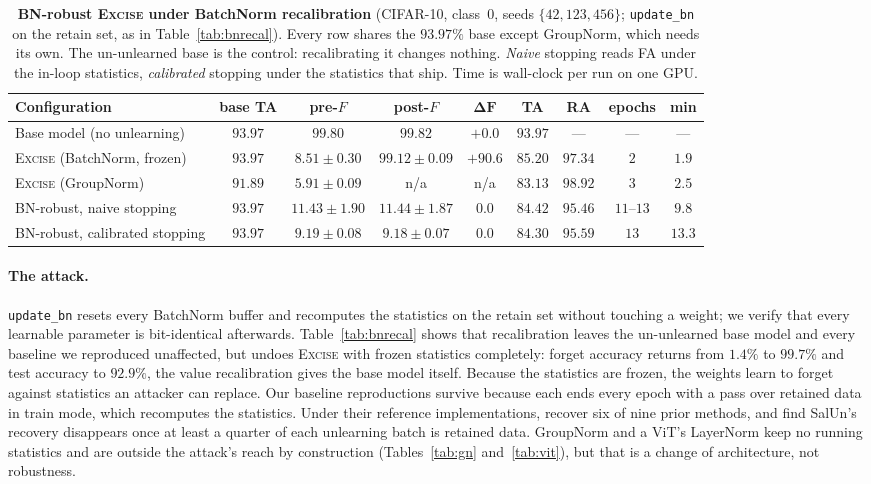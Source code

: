 \documentclass{article}
\newcommand{\ours}{\textsc{Excise}}
\newcommand{\added}[1]{{\color{revised}#1}}
\newcommand{\rev}[1]{{\color{revisedB}#1}}
\theoremstyle{remark}
\theoremstyle{plain}
\begin{document}
\begin{table}[t]
\centering\color{revised}
\caption{\added{\textbf{BN-robust \ours{} under BatchNorm recalibration} (CIFAR-10,
class~0, seeds $\{42,123,456\}$; \texttt{update\_bn} on the retain set, as in
Table~\ref{tab:bnrecal}). Every row shares the $93.97\%$ base except GroupNorm,
which needs its own. The un-unlearned base is the control: recalibrating it
changes nothing. \emph{Naive} stopping reads FA under the in-loop statistics,
\emph{calibrated} stopping under the statistics that ship. Time is wall-clock per
run on one GPU.}}
\label{tab:bnrobust}
\small
\setlength{\tabcolsep}{4pt}
\begin{tabular}{@{}lcccccccc@{}}
\toprule
Configuration & base TA & pre-$F$ & post-$F$ & $\boldsymbol{\Delta F}$ & TA & RA & epochs & min \\
\midrule
Base model (no unlearning)     & $93.97$ & $99.80$ & $99.82$ & $+0.0$ & $93.97$ & ---     & ---          & ---    \\
\ours{} (BatchNorm, frozen)    & $93.97$ & $8.51 \pm 0.30$  & $99.12 \pm 0.09$ & $\mathbf{+90.6}$ & $85.20$ & $97.34$ & $2$          & $1.9$  \\
\ours{} (GroupNorm)            & $91.89$ & $5.91 \pm 0.09$  & n/a              & n/a              & $83.13$ & $98.92$ & $3$          & $2.5$  \\
BN-robust, naive stopping      & $93.97$ & $11.43 \pm 1.90$ & $11.44 \pm 1.87$ & $\mathbf{0.0}$   & $84.42$ & $95.46$ & $11$--$13$   & $9.8$  \\
BN-robust, calibrated stopping & $93.97$ & $9.19 \pm 0.08$  & $9.18 \pm 0.07$  & $\mathbf{0.0}$   & $84.30$ & $95.59$ & $13$         & $13.3$ \\
\bottomrule
\end{tabular}
\end{table}

\paragraph{The attack.}
\texttt{update\_bn} resets every BatchNorm buffer and recomputes the statistics
on the retain set without touching a weight; we verify that every learnable
parameter is bit-identical afterwards. Table~\ref{tab:bnrecal} shows that
recalibration leaves the un-unlearned base model and every baseline we
reproduced unaffected, but undoes \ours{} with frozen statistics completely:
forget accuracy returns from $1.4\%$ to $99.7\%$ and test accuracy to $92.9\%$,
\rev{the value recalibration gives the base model itself}. Because the
statistics are frozen, the weights learn to forget against statistics an
attacker can replace. \rev{Our baseline reproductions survive because each ends
every epoch with a pass over retained data in train mode, which recomputes the
statistics. Under their reference implementations, \citet{kalani2026batchnorm}
recover six of nine prior methods, and find SalUn's recovery disappears once at
least a quarter of each unlearning batch is retained data.} GroupNorm and a ViT's
LayerNorm keep no running statistics and are outside the attack's reach by
construction (Tables~\ref{tab:gn} and~\ref{tab:vit}), but that is a change of
architecture, not robustness.
\end{document}
